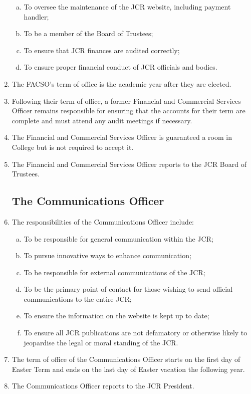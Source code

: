 \documentclass[12pt]{article}
\begin{document}
\begin{enumerate}
\begin{enumerate}[(a)]
        \item To oversee the maintenance of the JCR website, including payment handler;
        \item To be a member of the Board of Trustees;
        \item To ensure that JCR finances are audited correctly;
        \item To ensure proper financial conduct of JCR officials and bodies.
    \end{enumerate}
    \item The FACSO's term of office is the academic year after they are elected.
    \item Following their term of office, a former Financial and Commercial Services Officer remains responsible for ensuring that the accounts for their term are complete and must attend any audit meetings if necessary.
    \item The Financial and Commercial Services Officer is guaranteed a room in College but is not required to accept it.
    \item The Financial and Commercial Services Officer reports to the JCR Board of Trustees.
    \subsection{The Communications Officer}
    \item The responsibilities of the Communications Officer include:
    \begin{enumerate}[(a)]
        \item To be responsible for general communication within the JCR;
        \item To pursue innovative ways to enhance communication;
        \item To be responsible for external communications of the JCR;
        \item To be the primary point of contact for those wishing to send official communications to the entire JCR;
        \item To ensure the information on the website is kept up to date;
        \item To ensure all JCR publications are not defamatory or otherwise likely to jeopardise the legal or moral standing of the JCR.
    \end{enumerate}
    \item The term of office of the Communications Officer starts on the first day of Easter Term and ends on the last day of Easter vacation the following year.
    \item The Communications Officer reports to the JCR President.

\end{enumerate}
\end{document}
